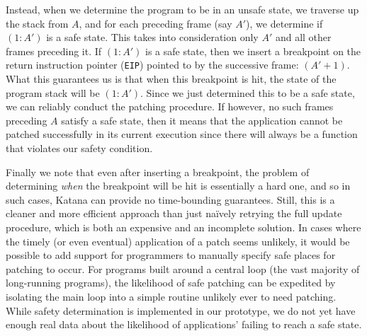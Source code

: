 Instead, when we determine the program to be in an unsafe state, we
traverse up the stack from $A$, and for each preceding frame (say
$A'$), we determine if $(1:A')$ is a safe state. This takes into
consideration only $A'$ and all other frames preceding it. If $(1:A')$
is a safe state, then we insert a breakpoint on the return instruction
pointer ({\tt EIP}) pointed to by the successive frame: $(A' +
1)$. What this guarantees us is that when this breakpoint is hit, the
state of the program stack will be $(1:A')$. Since we just determined
this to be a safe state, we can reliably conduct the patching
procedure. If however, no such frames preceding $A$ satisfy a safe
state, then it means that the application cannot be patched
successfully in its current execution since there will always be a
function that violates our safety condition.

Finally we note that even after inserting a breakpoint, the problem of
determining {\it when} the breakpoint will be hit is essentially a
hard one, and so in such cases, Katana can provide no time-bounding
guarantees. Still, this is a cleaner and more efficient approach than
just na\"{i}vely retrying the full update procedure, which is both an
expensive and an incomplete solution.
In cases where the timely (or even eventual) application of a patch
seems unlikely, it would be possible to add support for programmers to
manually specify safe places for patching to occur. For programs built
around a central loop (the vast majority of long-running programs),
the likelihood of safe patching can be expedited by isolating the main
loop into a simple routine unlikely ever to need patching. While
safety determination is implemented in our prototype, we do not yet
have enough real data about the likelihood of applications' failing to
reach a safe state.


